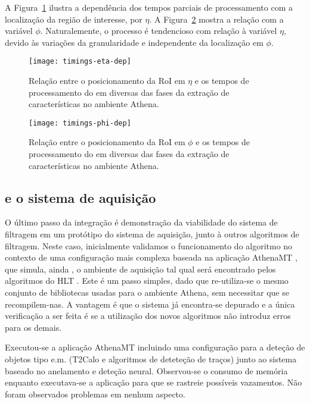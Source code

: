 A Figura~\ref{fig:timings-eta-dep} ilustra a dependência dos tempos parciais
de processamento com a localização da região de interesse, por $\eta$. A
Figura~\ref{fig:timings-phi-dep} mostra a relação com a variável
$\phi$. Naturalemente, o processo é tendencioso com relação à variável $\eta$,
devido às variações da granularidade e independente da localização em $\phi$.

\begin{figure}
\begin{center}
\texttt{[image: timings-eta-dep]}
\end{center}
\caption{Relação entre o posicionamento da RoI em $\eta$ e os tempos de
processamento do  em diversas das fases da extração de
características no ambiente Athena.}
\label{fig:timings-eta-dep}
\end{figure}

\begin{figure}
\begin{center}
\texttt{[image: timings-phi-dep]}
\end{center}
\caption{Relação entre o posicionamento da RoI em $\phi$ e os tempos de
processamento do  em diversas das fases da extração de
características no ambiente Athena.}
\label{fig:timings-phi-dep}
\end{figure}

\subsection{ e o sistema de aquisição}

O último passo da integração é demonstração da viabilidade do sistema de
filtragem em um protótipo do sistema de aquisição, junto à outros algoritmos
de filtragem. Neste caso, inicialmente validamos o funcionamento do algoritmo
no contexto de uma configuração mais complexa baseada na aplicação AthenaMT
\cite{aa:tns-2004-2}, que simula, ainda , o ambiente de aquisição
tal qual será encontrado pelos algoritmos do HLT . Este é um passo
simples, dado que re-utiliza-se o mesmo conjunto de bibliotecas usadas para o
ambiente Athena, sem necessitar que se recompilem-nas. A vantagem é que o
sistema já encontra-se depurado e a única verificação a ser feita é se a
utilização dos novos algoritmos não introduz erros para os demais.

Executou-se a aplicação AthenaMT incluindo uma configuração para a deteção de
objetos tipo e.m. (T2Calo e algoritmos de deteteção de traços) junto ao
sistema baseado no anelamento e deteção neural. Observou-se o consumo de
memória enquanto executava-se a aplicação para que se rastreie possíveis
vazamentos. Não foram observados problemas em nenhum aspecto.

